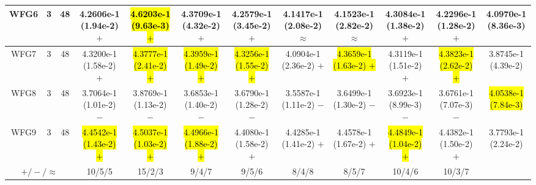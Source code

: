 \documentclass[journal]{IEEEtran}
\begin{document}
\begin{table*}[htbp]
\begin{tabular}{cccccccccccc}
\hline
\multirow{1}{*}{WFG6}&3&48&4.2606e-1 (1.94e-2) $+$&\hl{4.6203e-1 (9.63e-3) $+$}&4.3709e-1 (4.32e-2) $+$&4.2579e-1 (3.45e-2) $+$&4.1417e-1 (2.08e-2) $\approx$&4.1523e-1 (2.82e-2) $\approx$&4.3084e-1 (1.38e-2) $+$&4.2296e-1 (1.28e-2) $+$&4.0970e-1 (8.36e-3)\\
\hline
\multirow{1}{*}{WFG7}&3&48&4.3200e-1 (1.58e-2) $+$&\hl{4.3777e-1 (2.41e-2) $+$}&\hl{4.3959e-1 (1.49e-2) $+$}&\hl{4.3256e-1 (1.55e-2) $+$}&4.0904e-1 (2.36e-2) $+$&\hl{4.3659e-1 (1.63e-2) $+$}&4.3119e-1 (1.51e-2) $+$&\hl{4.3823e-1 (2.62e-2) $+$}&3.8745e-1 (4.39e-2)\\
\hline
\multirow{1}{*}{WFG8}&3&48&3.7064e-1 (1.01e-2) $-$&3.8769e-1 (1.13e-2) $-$&3.6853e-1 (1.40e-2) $-$&3.6790e-1 (1.28e-2) $-$&3.5587e-1 (1.11e-2) $-$&3.6499e-1 (1.30e-2) $-$&3.6923e-1 (8.99e-3) $-$&3.6761e-1 (7.07e-3) $-$&\hl{4.0538e-1 (7.84e-3)}\\
\hline
\multirow{1}{*}{WFG9}&3&48&\hl{4.4542e-1 (1.43e-2) $+$}&\hl{4.5037e-1 (1.03e-2) $+$}&\hl{4.4966e-1 (1.88e-2) $+$}&4.4080e-1 (1.58e-2) $+$&4.4285e-1 (1.41e-2) $+$&4.4578e-1 (1.67e-2) $+$&\hl{4.4849e-1 (1.04e-2) $+$}&4.4382e-1 (1.50e-2) $+$&3.7793e-1 (2.24e-2)\\
\hline
\multicolumn{3}{c}{$+/-/\approx$}&10/5/5&15/2/3&9/4/7&9/5/6&8/4/8&8/5/7&10/4/6&10/3/7&\\
\bottomrule
\end{tabular}
\label{No Label}
\end{table*}
\end{document}
